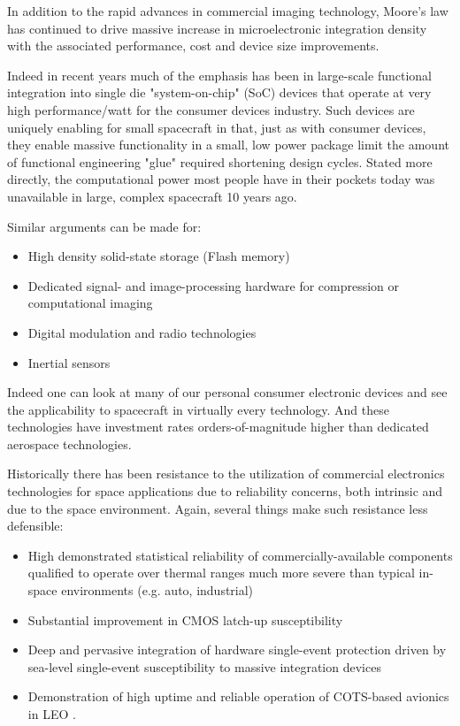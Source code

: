 \documentclass[10pt,journal]{IEEEtran}  %
\begin{document}
In addition to the rapid advances in commercial imaging technology, Moore's law has continued to drive massive increase in microelectronic integration density with the associated performance, cost and device size improvements.

Indeed in recent years much of the emphasis has been in large-scale functional integration into single die "system-on-chip" (SoC) devices that operate at very high performance/watt for the consumer devices industry.  Such devices are uniquely enabling for small spacecraft in that, just as with consumer devices, they enable massive functionality in a small, low power package limit the amount of functional engineering "glue" required shortening design cycles.  Stated more directly, the computational power most people have in their pockets today was unavailable in large, complex spacecraft 10 years ago.

Similar arguments can be made for:

\begin{itemize}
    \item High density solid-state storage (Flash memory)
    \item Dedicated signal- and image-processing hardware for compression or computational imaging
    \item Digital modulation and radio technologies
    \item Inertial sensors
\end{itemize}

Indeed one can look at many of our personal consumer electronic devices and see the applicability to spacecraft in virtually every technology.  And these technologies have investment rates orders-of-magnitude higher than dedicated aerospace technologies.

Historically there has been resistance to the utilization of commercial electronics technologies for space applications due to reliability concerns, both intrinsic and due to the space environment.  Again, several things make such resistance less defensible:

\begin{itemize}
    \item High demonstrated statistical reliability of commercially-available components qualified to operate over thermal ranges much more severe than typical in-space environments (e.g. auto, industrial)
    \item Substantial improvement in CMOS latch-up susceptibility
    \item Deep and pervasive integration of hardware single-event protection driven by sea-level single-event susceptibility to massive integration devices
    \item Demonstration of high uptime and reliable operation of COTS-based avionics in LEO \cite{careful_cost}.
\end{itemize}
\end{document}
